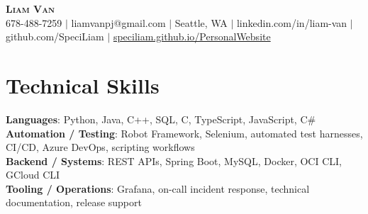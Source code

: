 \documentclass[letterpaper,11pt]{article}
\begin{document}

%
\begin{center}
    \textbf{\Huge \scshape Liam Van} \\ \vspace{1pt}
    \small 678-488-7259 $|$ \small {liamvanpj@gmail.com} $|$ Seattle, WA
 {{$|$ linkedin.com/in/liam-van} {$|$ github.com/SpeciLiam} {$|$ \href{https://speciliam.github.io/PersonalWebsite}{speciliam.github.io/PersonalWebsite}}}

\end{center}

\section{Technical Skills}
 \begin{itemize}[leftmargin=0.15in, label={}]
    \small{\item{
     \textbf{Languages}{: Python, Java, C++, SQL, C, TypeScript, JavaScript, C\#} \\
     \textbf{Automation / Testing}{: Robot Framework, Selenium, automated test harnesses, CI/CD, Azure DevOps, scripting workflows} \\
     \textbf{Backend / Systems}{: REST APIs, Spring Boot, MySQL, Docker, OCI CLI, GCloud CLI} \\
     \textbf{Tooling / Operations}{: Grafana, on-call incident response, technical documentation, release support} \\
    }}
 \end{itemize}
%

\end{document}
